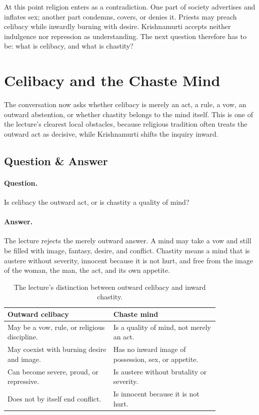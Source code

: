 At this point religion enters as a contradiction. One part of society advertises and inflates sex; another part condemns, covers, or denies it. Priests may preach celibacy while inwardly burning with desire. Krishnamurti accepts neither indulgence nor repression as understanding. The next question therefore has to be: what is celibacy, and what is chastity?

\section{Celibacy and the Chaste Mind}

The conversation now asks whether celibacy is merely an act, a rule, a vow, an outward abstention, or whether chastity belongs to the mind itself. This is one of the lecture's clearest local obstacles, because religious tradition often treats the outward act as decisive, while Krishnamurti shifts the inquiry inward.

\subsection{Question \& Answer}

\paragraph{Question.}
Is celibacy the outward act, or is chastity a quality of mind?

\paragraph{Answer.}
The lecture rejects the merely outward answer. A mind may take a vow and still be filled with image, fantasy, desire, and conflict. Chastity means a mind that is austere without severity, innocent because it is not hurt, and free from the image of the woman, the man, the act, and its own appetite.

\begin{table}
\centering
\begin{tabular}{|p{0.42\linewidth}|p{0.42\linewidth}|}
\hline
\textbf{Outward celibacy} & \textbf{Chaste mind} \\
\hline
May be a vow, rule, or religious discipline. & Is a quality of mind, not merely an act. \\
\hline
May coexist with burning desire and image. & Has no inward image of possession, sex, or appetite. \\
\hline
Can become severe, proud, or repressive. & Is austere without brutality or severity. \\
\hline
Does not by itself end conflict. & Is innocent because it is not hurt. \\
\hline
\end{tabular}
\caption{The lecture's distinction between outward celibacy and inward chastity.}
\end{table}

